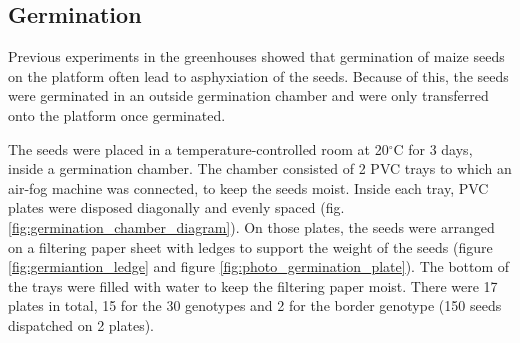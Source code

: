 \subsection{Germination}
Previous experiments in the greenhouses showed that germination of maize seeds on the platform often lead to asphyxiation of the 
seeds. 
Because of this, the seeds were germinated in an outside germination chamber and were only transferred onto the platform once 
germinated.

The seeds were placed in a temperature-controlled room at 20$^{\circ}$C for 3 days, inside a germination chamber. The chamber consisted of 2 PVC trays to which an air-fog machine was connected, to keep the seeds moist. 
Inside each tray, PVC plates were disposed diagonally and evenly spaced (fig. \ref{fig:germination_chamber_diagram}). On those plates, the seeds were arranged on a filtering paper sheet with ledges to support the weight of the seeds (figure \ref{fig:germiantion_ledge} and figure \ref{fig:photo_germination_plate}). The bottom of the trays were filled with water to keep the filtering paper moist. 
There were 17 plates in total, 15 for the 30 genotypes and 2 for the border genotype (150 seeds dispatched on 2 plates). 


